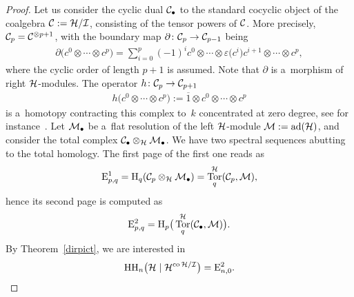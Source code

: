 \documentclass[pdftex]{sigma}
\numberwithin{equation}{section}
\DeclareMathOperator{\ad}{ad}
\DeclareMathOperator{\co}{co}
\DeclareMathOperator{\Tor}{Tor}
\begin{document}
\begin{proof}
Let us consider the cyclic dual ${\cal C}_{\bullet}$ to the standard cocyclic object of the coalgebra ${\cal C}:={\cal
H}/{\cal I}$, consisting of the tensor powers of ${\cal C}$.
More precisely, ${\cal C}_{p}={\cal C}^{\otimes p+1}$, with the boundary map $\partial\colon {\cal C}_{p}\rightarrow {\cal
C}_{p-1}$ being
\begin{gather*}
\partial\big(c^0\otimes\cdots\otimes c^p\big)=\sum\limits_{i=0}^{p}(-1)^i
c^0\otimes\cdots\otimes\varepsilon\big(c^i\big)c^{i+1}\otimes\cdots\otimes c^p,
\end{gather*}
where the cyclic order of length $p+1$ is assumed.
Note that $\partial$ is a~morphism of right ${\cal H}$-modules.
The operator $h\colon {\cal C}_{p}\rightarrow {\cal C}_{p+1}$
\begin{gather*}
h\big(c^0\otimes\cdots\otimes c^p\big):=\overline{1}\otimes c^0\otimes\cdots\otimes c^p
\end{gather*}
is a~homotopy contracting this complex to~$k$ concentrated at zero degree, see for instance~\cite{KhalRang05}.
Let ${\cal M}_{\bullet}$ be a~f\/lat resolution of the left ${\cal H}$-module ${\cal M}:=\ad({\cal H})$, and consider
the total complex ${\cal C}_{\bullet}\otimes_{{\cal H}}{\cal M}_{\bullet}$.
We have two spectral sequences abutting to the total homology.
The f\/irst page of the f\/irst one reads as
\begin{gather*}
{\rm E}^1_{p,q}={\rm H}_{q}({\cal C}_{p}\otimes_{{\cal H}}{\cal M}_{\bullet})=\Tor^{{\cal H}}_q({\cal C}_{p},{\cal M}),
\end{gather*}
hence its second page is computed as
\begin{gather*}
{\rm E}^2_{p,q}={\rm H}_p\big(\Tor^{{\cal H}}_q({\cal C}_{\bullet},{\cal M})\big).
\end{gather*}
By Theorem~\ref{dirpict}, we are interested in
\begin{gather}
\label{rel}
{\rm HH}_n\big({\cal H}\mid {\cal H}^{\co{\cal H}/{\cal I}}\big)={\rm E}^2_{n,0}.
\end{gather}


\end{proof}
\end{document}
